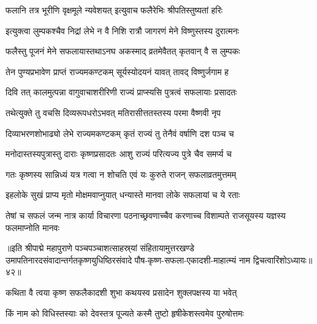 \twolineshloka
{फलानि तत्र भूरीणि वृक्षमूले न्यवेशयत्}%
{इत्युवाच फलैरेभिः श्रीपतिस्तुष्यतां हरिः}

\twolineshloka
{इत्युक्त्वा लुम्पकश्चैव निद्रां लेभे न वै निशि}%
{रात्रौ जागरणं मेने विष्णुस्तस्य दुरात्मनः}

\twolineshloka
{फलैस्तु पूजनं मेने सफलायास्तथाऽनघ}%
{अकस्माद् व्रतमेवैतत् कृतवान् वै  स लुम्पकः}

\twolineshloka
{तेन पुण्यप्रभावेण प्राप्तं राज्यमकण्टकम्}%
{सूर्यस्योदयनं यावत् तावद् विष्णुर्जगाम ह}

\twolineshloka
{दिवि तत् कालमुत्पन्ना वागुवाचाशरीरिणी}%
{राज्यं प्राप्स्यसि पुत्रत्वं सफलायाः प्रसादतः}

\twolineshloka
{तथेत्युक्ते तु वचसि दिव्यरूपधरोऽभवत्}%
{मतिरासीत्ततस्तस्य परमा वैष्णवी नृप}

\twolineshloka
{दिव्याभरणशोभाढ्यो लेभे राज्यमकण्टकम्}%
{कृतं राज्यं तु तेनैवं वर्षाणि दश पञ्च च}

\twolineshloka
{मनोदास्तस्यपुत्रास्तु दाराः कृष्णप्रसादतः}%
{आशु राज्यं परित्यज्य पुत्रे चैव समर्प्य च}

\twolineshloka
{गतः कृष्णस्य सान्निध्यं यत्र गत्वा न शोचति}%
{एवं यः कुरुते राजन् सफलाव्रतमुत्तमम्}

\twolineshloka
{इहलोके सुखं प्राप्य मृतो मोक्षमवाप्नुयात्}%
{धन्यास्ते मानवा लोके सफलायां च ये रताः}

\threelineshloka
{तेषां च सफलं जन्म नात्र कार्या विचारणा}%
{पठनाच्छ्रवणाच्चैव करणाच्च विशाम्पते}
{राजसूयस्य यज्ञस्य फलमाप्नोति मानवः}

॥इति श्रीपाद्मे महापुराणे पञ्चपञ्चाशत्साहस्र्यां संहितायामुत्तरखण्डे उमापतिनारदसंवादान्तर्गतकृष्णयुधिष्ठिरसंवादे पौष-कृष्ण-सफला-एकादशी-माहात्म्यं नाम द्विचत्वारिंशोऽध्यायः॥४२॥

\genMangalaShloka

\hyperref[sec:ekadashi_mahatmyam_padma_puranam]{\closesub}
\clearpage

\label{sec:padma-pausha-shukla-putrada}

\ganapatyadiDhyanam
\padmaPuranam



\twolineshloka
{कथिता वै त्वया कृष्ण सफलैकादशी शुभा}
{कथयस्व प्रसादेन शुक्लपक्षस्य या भवेत्}%

\twolineshloka
{किं नाम को विधिस्तस्याः को देवस्तत्र पूज्यते}
{कस्मै तुष्टो हृषीकेशस्त्वमेव पुरुषोत्तमः}%

